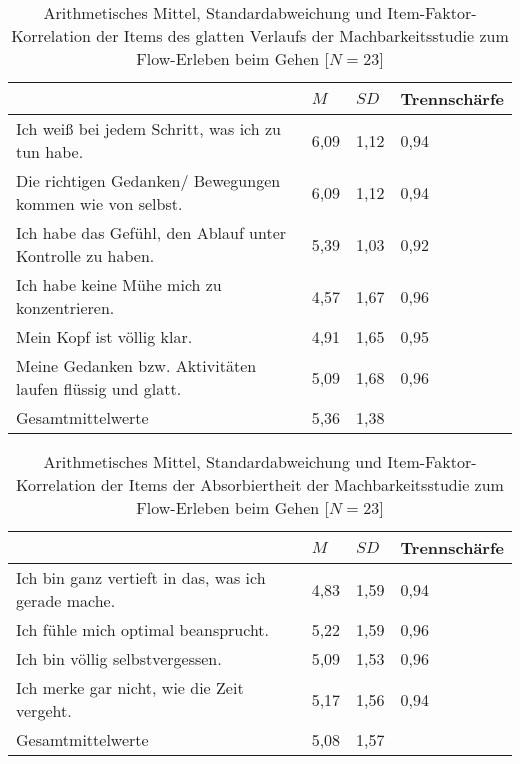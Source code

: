 \begin{table}
	[!htb] \centering \caption[Item-Faktor-Korrelation der Items des glatten Verlaufs (Gehstudie -- intraindividuell)]{Arithmetisches Mittel, Standardabweichung und Item-Faktor-Korrelation der Items des glatten Verlaufs der Machbarkeitsstudie zum Flow-Erleben beim Gehen [$N = 23$]} \label{tab:glatter_verlauf_2} 
	\begin{tabularx}
		{ 
		\textwidth}{p{} p{} p{} p{}} \toprule & $M$ & $SD$ & Trennschärfe \\
		\midrule Ich weiß bei jedem Schritt, was ich zu tun habe. & 6,09 & 1,12 & 0,94 \\
		Die richtigen Gedanken/ Bewegungen kommen wie von selbst. & 6,09 & 1,12 & 0,94 \\
		Ich habe das Gefühl, den Ablauf unter Kontrolle zu haben. & 5,39 & 1,03 & 0,92 \\
		Ich habe keine Mühe mich zu konzentrieren. & 4,57 & 1,67 & 0,96 \\
		Mein Kopf ist völlig klar. & 4,91 & 1,65 & 0,95 \\
		Meine Gedanken bzw. Aktivitäten laufen flüssig und glatt. & 5,09 & 1,68 & 0,96 \\
		Gesamtmittelwerte & 5,36 & 1,38 & \\
		\bottomrule 
	\end{tabularx}
\end{table}
\begin{table}
	[!htb] \centering \caption[Item-Faktor-Korrelation der Items der Absorbiertheit (Gehstudie -- intraindividuell)]{Arithmetisches Mittel, Standardabweichung und Item-Faktor-Korrelation der Items der Absorbiertheit der Machbarkeitsstudie zum Flow-Erleben beim Gehen [$N = 23$]} \label{tab:absorbiertheit_2} 
	\begin{tabularx}
		{ 
		\textwidth}{p{} p{} p{} p{}} \toprule & $M$ & $SD$ & Trennschärfe \\
		\midrule Ich bin ganz vertieft in das, was ich gerade mache. & 4,83 & 1,59 & 0,94 \\
		Ich fühle mich optimal beansprucht. & 5,22 & 1,59 & 0,96 \\
		Ich bin völlig selbstvergessen. & 5,09 & 1,53 & 0,96 \\
		Ich merke gar nicht, wie die Zeit vergeht. & 5,17 & 1,56 & 0,94 \\
		Gesamtmittelwerte & 5,08 & 1,57 & \\
		\bottomrule 
	\end{tabularx}
\end{table}
